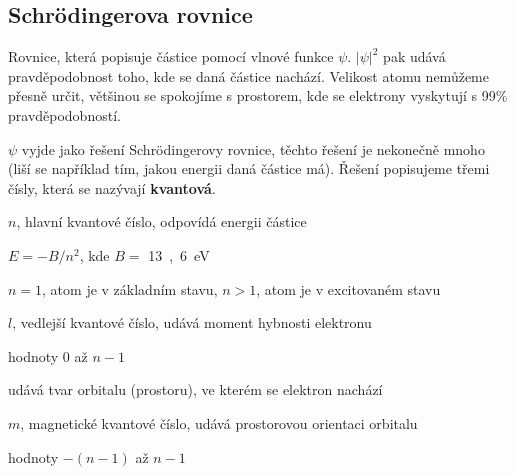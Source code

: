 \documentclass[DIV=8]{scrreprt}
\begin{document}
\subsection{Schrödingerova rovnice} \label{Schrödingerova rovnice}


Rovnice, která popisuje částice pomocí vlnové funkce \(\psi\). \(|\psi|^2\) pak udává pravděpodobnost toho, kde se daná částice nachází. Velikost atomu nemůžeme přesně určit, většinou se spokojíme s prostorem, kde se elektrony vyskytují s 99\% pravděpodobností.

\(\psi\) vyjde jako řešení Schrödingerovy rovnice, těchto řešení je nekonečně mnoho (liší se například tím, jakou energii daná částice má). Řešení popisujeme třemi čísly, která se nazývají \textbf{kvantová}.
\begin{myItemize}[nosep]
    \item \(n\), hlavní kvantové číslo, odpovídá energii částice
\begin{myItemize}[nosep]
    \item \(E = -B/n^2\), kde \(B =\) \si{13,6 eV}
    \item \(n = 1\), atom je v základním stavu, \(n > 1\), atom je v excitovaném stavu
\end{myItemize}

    \item \(l\), vedlejší kvantové číslo, udává moment hybnosti elektronu
\begin{myItemize}[nosep]
    \item hodnoty 0 až \(n-1\)
    \item udává tvar orbitalu (prostoru), ve kterém se elektron nachází
\end{myItemize}

    \item \(m\), magnetické kvantové číslo, udává prostorovou orientaci orbitalu
\begin{myItemize}[nosep]
    \item hodnoty \(-(n - 1)\) až \(n-1\)
\end{myItemize}

\end{myItemize}




\end{document}
